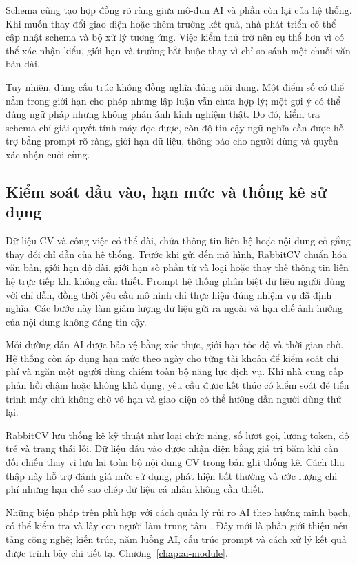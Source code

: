 Schema cũng tạo hợp đồng rõ ràng giữa mô-đun AI và phần còn lại của hệ thống. Khi muốn thay đổi giao diện hoặc thêm trường kết quả, nhà phát triển có thể cập nhật schema và bộ xử lý tương ứng. Việc kiểm thử trở nên cụ thể hơn vì có thể xác nhận kiểu, giới hạn và trường bắt buộc thay vì chỉ so sánh một chuỗi văn bản dài.

Tuy nhiên, đúng cấu trúc không đồng nghĩa đúng nội dung. Một điểm số có thể nằm trong giới hạn cho phép nhưng lập luận vẫn chưa hợp lý; một gợi ý có thể đúng ngữ pháp nhưng không phản ánh kinh nghiệm thật. Do đó, kiểm tra schema chỉ giải quyết tính máy đọc được, còn độ tin cậy ngữ nghĩa cần được hỗ trợ bằng prompt rõ ràng, giới hạn dữ liệu, thông báo cho người dùng và quyền xác nhận cuối cùng.

\subsection{Kiểm soát đầu vào, hạn mức và thống kê sử dụng}

Dữ liệu CV và công việc có thể dài, chứa thông tin liên hệ hoặc nội dung cố gắng thay đổi chỉ dẫn của hệ thống. Trước khi gửi đến mô hình, RabbitCV chuẩn hóa văn bản, giới hạn độ dài, giới hạn số phần tử và loại hoặc thay thế thông tin liên hệ trực tiếp khi không cần thiết. Prompt hệ thống phân biệt dữ liệu người dùng với chỉ dẫn, đồng thời yêu cầu mô hình chỉ thực hiện đúng nhiệm vụ đã định nghĩa. Các bước này làm giảm lượng dữ liệu gửi ra ngoài và hạn chế ảnh hưởng của nội dung không đáng tin cậy.

Mỗi đường dẫn AI được bảo vệ bằng xác thực, giới hạn tốc độ và thời gian chờ. Hệ thống còn áp dụng hạn mức theo ngày cho từng tài khoản để kiểm soát chi phí và ngăn một người dùng chiếm toàn bộ năng lực dịch vụ. Khi nhà cung cấp phản hồi chậm hoặc không khả dụng, yêu cầu được kết thúc có kiểm soát để tiến trình máy chủ không chờ vô hạn và giao diện có thể hướng dẫn người dùng thử lại.

RabbitCV lưu thống kê kỹ thuật như loại chức năng, số lượt gọi, lượng token, độ trễ và trạng thái lỗi. Dữ liệu đầu vào được nhận diện bằng giá trị băm khi cần đối chiếu thay vì lưu lại toàn bộ nội dung CV trong bản ghi thống kê. Cách thu thập này hỗ trợ đánh giá mức sử dụng, phát hiện bất thường và ước lượng chi phí nhưng hạn chế sao chép dữ liệu cá nhân không cần thiết.

Những biện pháp trên phù hợp với cách quản lý rủi ro AI theo hướng minh bạch, có thể kiểm tra và lấy con người làm trung tâm \cite{nistairmf}. Đây mới là phần giới thiệu nền tảng công nghệ; kiến trúc, năm luồng AI, cấu trúc prompt và cách xử lý kết quả được trình bày chi tiết tại Chương~\ref{chap:ai-module}.

